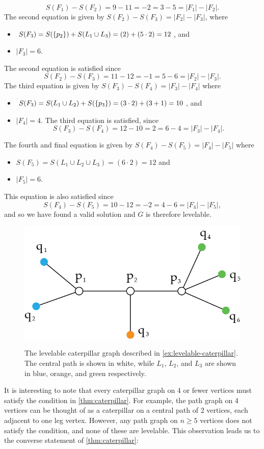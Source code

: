 \begin{example}
$$
S(F_1) - S(F_2) = 9 - 11 = -2 = 3 - 5 = |F_1| - |F_2|.
$$
The second equation is given by $S(F_2) - S(F_3) = |F_2| - |F_3|$, where
\begin{itemize}
\item $S(F_3) = S(\{ p_2 \}) + S(L_1 \cup L_3) = (2) + (5 \cdot 2) = 12$, and
\item $|F_3| = 6$.
\end{itemize} 
The second equation is satisfied since
$$
S(F_2) - S(F_3) = 11 - 12 = -1 = 5 - 6 = |F_2| - |F_3|.
$$
The third equation is given by $S(F_3) - S(F_4) = |F_3| - |F_4|$ where
\begin{itemize}
\item $S(F_3) = S(L_1 \cup L_2) + S(\{ p_3 \}) = (3 \cdot 2) + (3+1) = 10$, and
\item $|F_4| = 4$.
The third equation is satisfied, since
$$
S(F_3) - S(F_4) = 12 - 10 = 2 = 6 - 4 = |F_3| - |F_4|.
$$
\end{itemize}
The fourth and final equation is given by $S(F_4) - S(F_5) = |F_4| - |F_5|$ where
\begin{itemize}
\item $S(F_5) = S(L_1 \cup L_2 \cup L_3) = (6 \cdot 2) = 12$ and
\item $|F_5| = 6$.
\end{itemize}
This equation is also satisfied since 
$$
S(F_4) - S(F_5) = 10 - 12 = -2 = 4 - 6 = |F_4| - |F_5|,
$$
and so we have found a valid solution and $G$ is therefore levelable.
\end{example}
\begin{figure}[bth] 
    \myfloatalign
    \vspace{0.25cm}
    {\includegraphics[width=.45\linewidth]{figures/caterpillar-ex.png}} 
    \caption{The levelable caterpillar graph described in \autoref{ex:levelable-caterpillar}. The central path is shown in white, while $L_1$, $L_2$, and $L_3$ are shown in blue, orange, and green respectively.} \label{fig:caterpillar-ex}
\end{figure}

It is interesting to note that every caterpillar graph on 4 or fewer vertices must satisfy the condition in \autoref{thm:caterpillar}. For example, the path graph on 4 vertices can be thought of as a caterpillar on a central path of 2 vertices, each adjacent to one leg vertex. However, any path graph on $n \geq 5$ vertices does not satisfy the condition, and none of these are levelable. This observation leads us to the converse statement of \autoref{thm:caterpillar}:

